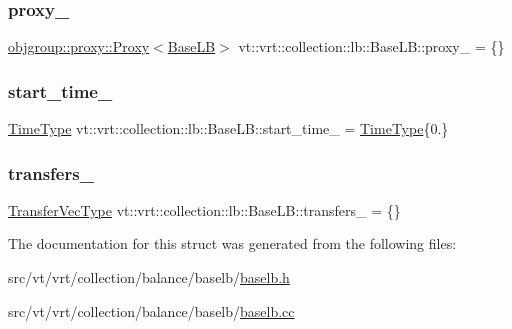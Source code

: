 \mbox{\label{structvt_1_1vrt_1_1collection_1_1lb_1_1_base_l_b_ab5cfe4d0cb73397c5ffe937f119bc71a}} 
\subsubsection{\texorpdfstring{proxy\+\_\+}{proxy\_}}
{\footnotesize\ttfamily \hyperlink{structvt_1_1objgroup_1_1proxy_1_1_proxy}{objgroup\+::proxy\+::\+Proxy}$<$\hyperlink{structvt_1_1vrt_1_1collection_1_1lb_1_1_base_l_b}{Base\+LB}$>$ vt\+::vrt\+::collection\+::lb\+::\+Base\+L\+B\+::proxy\+\_\+ = \{\}\hspace{0.3cm}{\ttfamily [protected]}}

\mbox{\label{structvt_1_1vrt_1_1collection_1_1lb_1_1_base_l_b_a5df60167861bf4058c72f02f3fd39fd8}} 
\subsubsection{\texorpdfstring{start\+\_\+time\+\_\+}{start\_time\_}}
{\footnotesize\ttfamily \hyperlink{namespacevt_a2b9f28078dc309ad0706b69ded743e69}{Time\+Type} vt\+::vrt\+::collection\+::lb\+::\+Base\+L\+B\+::start\+\_\+time\+\_\+ = \hyperlink{namespacevt_a2b9f28078dc309ad0706b69ded743e69}{Time\+Type}\{0.\}\hspace{0.3cm}{\ttfamily [protected]}}

\mbox{\label{structvt_1_1vrt_1_1collection_1_1lb_1_1_base_l_b_a815315640fe4e41e39d1872e115b8574}} 
\subsubsection{\texorpdfstring{transfers\+\_\+}{transfers\_}}
{\footnotesize\ttfamily \hyperlink{structvt_1_1vrt_1_1collection_1_1lb_1_1_base_l_b_a329e8179ec41a1bd4924c79fe23a79af}{Transfer\+Vec\+Type} vt\+::vrt\+::collection\+::lb\+::\+Base\+L\+B\+::transfers\+\_\+ = \{\}\hspace{0.3cm}{\ttfamily [private]}}



The documentation for this struct was generated from the following files\+:\begin{DoxyCompactItemize}
\item 
src/vt/vrt/collection/balance/baselb/\hyperlink{baselb_8h}{baselb.\+h}\item 
src/vt/vrt/collection/balance/baselb/\hyperlink{baselb_8cc}{baselb.\+cc}\end{DoxyCompactItemize}
